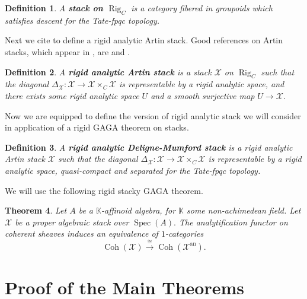 \documentclass[11pt]{amsart}
\newtheorem{theorem}{Theorem}[section]
\newtheorem{definition}[theorem]{Definition}
\theoremstyle{definition}
\numberwithin{equation}{section}
\newcommand{\Spec}{\operatorname{Spec}} 	%
\newcommand{\sX}{\mathscr{X}}		%
\newcommand{\bbK}{\mathbb{K}}		%
\begin{document}
		\begin{definition}
			A \textbf{stack on $\operatorname{Rig}_C$} is a category fibered in groupoids which satisfies descent for the Tate-fpqc topology. 
		\end{definition}
		
		Next we cite \cite{Emerton-Gee-Hellman-categorical-p-adic-langlands} to define a rigid analytic Artin stack. Good references on Artin stacks, which appear in \cite{Artin-versal-deformations-algebraic-stacks}, are  \cite{Abramovich-Olsson-Vistoli-tame-stacks-pos-characteristic} and \cite{Abramovich-Olsson-Vistoli-twisted-stable-maps-tame-Artin-stacks}.
		
		\begin{definition}\cite[$5.1.10$]{Emerton-Gee-Hellman-categorical-p-adic-langlands}
			A \textbf{rigid analytic Artin stack} is a stack $\sX$ on $\operatorname{Rig}_C$ such that the diagonal $\Delta_{\sX}:\sX\to \sX\times_C \sX$ is representable by a rigid analytic space, and there exists some rigid analytic space $U$ and a smooth surjective map $U\to \sX.$
		\end{definition}
		
		Now we are equipped to define the version of rigid analytic stack we will consider in application of a rigid GAGA theorem on stacks. 
		
		\begin{definition}
			\label{def: rigid analytic DM stack v2}
			A \textbf{rigid analytic Deligne-Mumford stack} is a rigid analytic Artin stack $\sX$ such that the diagonal $\Delta_{\sX}:\sX\to \sX\times_C\sX$ is representable by a rigid analytic space, quasi-compact and separated for the Tate-fpqc topology. 
		\end{definition}
		
		We will use the following rigid stacky GAGA theorem.
		
		\begin{theorem}\cite[$7.4$]{Porta-Yu-Higher-analytic-stacks-GAGA}
			Let $A$ be a $\bbK$-affinoid algebra, for $\bbK$ some non-achimedean field. Let $\sX$ be a proper algebraic stack over $\Spec(A).$ The analytification functor on coherent sheaves induces an equivalence of $1$-categories
			\[\operatorname{Coh}(\sX)\overset{\cong}{\to} \operatorname{Coh}(\sX^{\text{an}}).\] 
		\end{theorem}
		
		\section{Proof of the Main Theorems}
		
\end{document}
